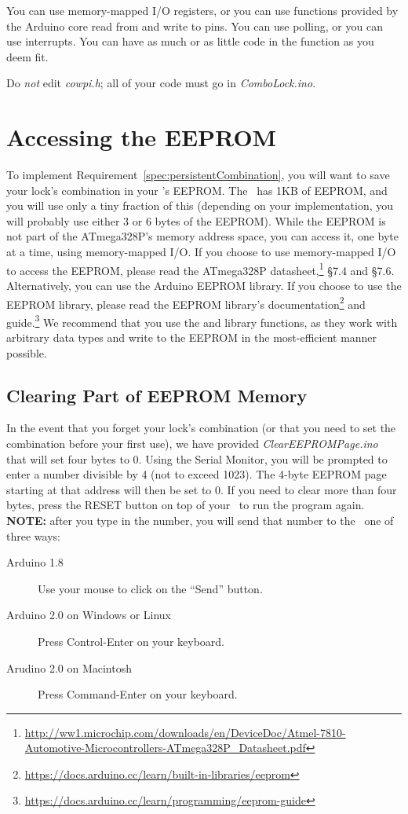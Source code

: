 You can use memory-mapped I/O registers, or you can use functions provided by
the Arduino core read from and write to pins. You can use polling, or you can
use interrupts. You can have as much or as little code in the 
function as you deem fit.

Do \textit{not} edit \textit{cowpi.h}; all of your code must go in
\textit{ComboLock.ino}.

\section{Accessing the EEPROM} \label{sec:AccessingEEProm}

To implement Requirement~\ref{spec:persistentCombination}, you will want to save
your lock's combination in your \nano's EEPROM. The \nano\ has 1KB of EEPROM,
and you will use only a tiny fraction of this (depending on your implementation,
you will probably use either 3 or 6 bytes of the EEPROM). While the EEPROM is
not part of the ATmega328P's memory address space, you can access it, one byte
at a time, using memory-mapped I/O. If you choose to use memory-mapped I/O to access the EEPROM, please read the ATmega328P
datasheet,\footnote{\url{http://ww1.microchip.com/downloads/en/DeviceDoc/Atmel-7810-Automotive-Microcontrollers-ATmega328P_Datasheet.pdf}}
§7.4 and §7.6. Alternatively, you can use the Arduino EEPROM library. If you
choose to use the EEPROM library, please read the EEPROM library's
documentation\footnote{\url{https://docs.arduino.cc/learn/built-in-libraries/eeprom}}
and guide.\footnote{\url{https://docs.arduino.cc/learn/programming/eeprom-guide}}
We recommend that you use the  and
 library functions, as they work with arbitrary data
types and write to the EEPROM in the most-efficient manner possible.

\subsection*{Clearing Part of EEPROM Memory}

In the event that you forget your lock's combination (or that you need to set
the combination before your first use), we have provided
\textit{ClearEEPROMPage.ino} that will set four bytes to 0. Using the Serial
Monitor, you will be prompted to enter a number divisible by 4 (not to exceed
1023). The 4-byte EEPROM page starting at that address will then be set to 0.
If you need to clear more than four bytes, press the RESET button on top of your
\nano\ to run the program again.
\textbf{NOTE:} after you type in the number, you will send that number to the
\nano\ one of three ways:
\begin{description}
\item [Arduino 1.8] Use your mouse to click on the ``Send'' button.
\item [Arduino 2.0 on Windows or Linux] Press Control-Enter on your keyboard.
\item [Arudino 2.0 on Macintosh] Press Command-Enter on your keyboard.
\end{description}


